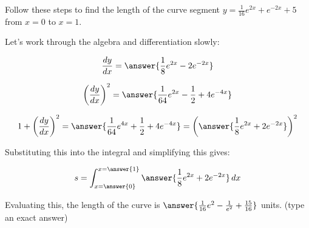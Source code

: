\documentclass{ximera}
\author{Jim Talamo}
\begin{document}
\begin{exercise}

Follow these steps to find the length of the curve segment $y=\frac{1}{16}e^{2x}+e^{-2x}+5$ from $x=0$ to $x=1$.

Let's work through the algebra and differentiation slowly:

\[
\frac{\d y}{\d x} = \answer{\frac{1}{8}e^{2x}-2e^{-2x}}
\]
\begin{exercise}
\[
\left(\frac{\d y}{\d x}\right)^2 = \answer{\frac{1}{64}e^{2x}-\frac{1}{2}+4e^{-4x}}
\]

\begin{exercise}

\[
1+ \left(\frac{\d y}{\d x}\right)^2 = \answer{\frac{1}{64}e^{4x}+\frac{1}{2}+4e^{-4x}} = \left(\answer{\frac{1}{8}e^{2x}+2e^{-2x} }  \right)^2
\]

\begin{exercise}
Substituting this into the integral and simplifying this gives:

\[
s= \int_{x=\answer{0}}^{x=\answer{1}} \answer{\frac{1}{8}e^{2x}+2e^{-2x}} \d x 
\]

Evaluating this, the length of the curve is $\answer{\frac{1}{16}e^2-\frac{1}{e^2} +\frac{15}{16} }$ units. (type an exact answer)


\end{exercise}
\end{exercise}
\end{exercise}



\end{exercise}
\end{document}
